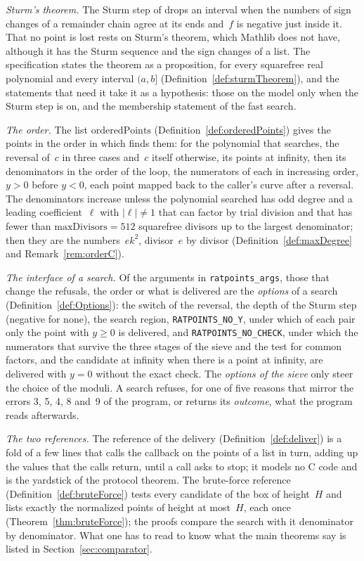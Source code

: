 \emph{Sturm's theorem.} The Sturm step of \ratpoints{} drops an interval when the numbers of sign
changes of a remainder chain agree at its ends and~$f$ is negative just inside it. That no point is
lost rests on Sturm's theorem, which Mathlib does not have, although it has the Sturm sequence and
the sign changes of a list. The specification states the theorem as a proposition, for every
squarefree real polynomial and every interval $(a, b]$ (Definition~\ref{def:sturmTheorem}), and the
statements that need it take it as a hypothesis: those on the model only when the Sturm step is on,
and the membership statement of the fast search.

\emph{The order.} The list $\mathrm{orderedPoints}$ (Definition~\ref{def:orderedPoints}) gives the
points in the order in which \ratpoints{} finds them: for the polynomial that \ratpoints{} searches, the
reversal of~$c$ in three cases and~$c$ itself otherwise, its points at infinity, then its
denominators in the order of the loop, the numerators of each in increasing order, $y > 0$ before
$y < 0$, each point mapped back to the caller's curve after a reversal. The denominators increase
unless the polynomial searched has odd degree and a leading coefficient~$\ell$ with $|\ell| \ne 1$
that \ratpoints{} can factor by trial division and that has fewer than $\mathrm{maxDivisors} = 512$
squarefree divisors up to the largest denominator; then they are the numbers~$e k^2$, divisor~$e$
by divisor (Definition~\ref{def:maxDegree} and Remark~\ref{rem:orderC}).

\emph{The interface of a search.} Of the arguments in \verb|ratpoints_args|, those that change the
refusals, the order or what is delivered are the \emph{options} of a search
(Definition~\ref{def:Options}): the switch of the reversal, the depth of the Sturm step (negative
for none), the search region, \verb|RATPOINTS_NO_Y|, under which of each pair only the point with
$y \ge 0$ is delivered, and \verb|RATPOINTS_NO_CHECK|, under which the numerators that survive the
three stages of the sieve and the test for common factors, and the candidate at infinity when there
is a point at infinity, are delivered with $y = 0$ without the exact check. The \emph{options of the
sieve} only steer the choice of the moduli. A search refuses, for one of five reasons that mirror
the errors 3, 5, 4, 8 and~9 of the program, or returns its \emph{outcome}, what the program reads
afterwards.

\emph{The two references.} The reference of the delivery (Definition~\ref{def:deliver}) is a fold
of a few lines that calls the callback on the points of a list in turn, adding up the values that
the calls return, until a call asks to stop; it models no C code and is the yardstick of the
protocol theorem. The brute-force reference (Definition~\ref{def:bruteForce}) tests every candidate
of the box of height~$H$ and lists exactly the normalized points of height at most~$H$, each once
(Theorem~\ref{thm:bruteForce}); the proofs compare the search with it denominator by denominator.
What one has to read to know what the main theorems say is listed in Section~\ref{sec:comparator}.

